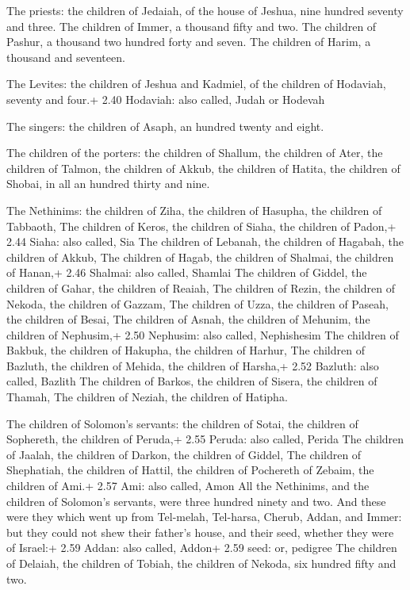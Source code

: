  The priests: the children of Jedaiah, of the house of
Jeshua, nine hundred seventy and three.  The children of
Immer, a thousand fifty and two.  The children of Pashur, a
thousand two hundred forty and seven.  The children of
Harim, a thousand and seventeen.

 The Levites: the children of Jeshua and Kadmiel, of the
children of Hodaviah, seventy and four.+ 2.40 Hodaviah: also called,
Judah or Hodevah

 The singers: the children of Asaph, an hundred twenty
and eight.

 The children of the porters: the children of Shallum,
the children of Ater, the children of Talmon, the children of Akkub, the
children of Hatita, the children of Shobai, in all an hundred thirty and
nine.

 The Nethinims: the children of Ziha, the children of
Hasupha, the children of Tabbaoth,  The children of Keros,
the children of Siaha, the children of Padon,+ 2.44 Siaha: also called,
Sia  The children of Lebanah, the children of Hagabah, the
children of Akkub,  The children of Hagab, the children of
Shalmai, the children of Hanan,+ 2.46 Shalmai: also called, Shamlai
 The children of Giddel, the children of Gahar, the
children of Reaiah,  The children of Rezin, the children of
Nekoda, the children of Gazzam,  The children of Uzza, the
children of Paseah, the children of Besai,  The children of
Asnah, the children of Mehunim, the children of Nephusim,+ 2.50
Nephusim: also called, Nephishesim  The children of Bakbuk,
the children of Hakupha, the children of Harhur,  The
children of Bazluth, the children of Mehida, the children of Harsha,+
2.52 Bazluth: also called, Bazlith  The children of Barkos,
the children of Sisera, the children of Thamah,  The
children of Neziah, the children of Hatipha.

 The children of Solomon's servants: the children of
Sotai, the children of Sophereth, the children of Peruda,+ 2.55 Peruda:
also called, Perida  The children of Jaalah, the children
of Darkon, the children of Giddel,  The children of
Shephatiah, the children of Hattil, the children of Pochereth of Zebaim,
the children of Ami.+ 2.57 Ami: also called, Amon  All the
Nethinims, and the children of Solomon's servants, were three hundred
ninety and two.  And these were they which went up from
Tel-melah, Tel-harsa, Cherub, Addan, and Immer: but they could not shew
their father's house, and their seed, whether they were of Israel:+ 2.59
Addan: also called, Addon+ 2.59 seed: or, pedigree  The
children of Delaiah, the children of Tobiah, the children of Nekoda, six
hundred fifty and two.

